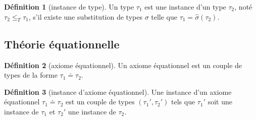 \documentclass [a4paper,12pt] {article}
\theoremstyle {definition}
\newtheorem {definition} {Définition} [subsection]
\begin{document}
\begin {definition} [instance de type]
	Un type $\tau_1$ est une instance d'un type $\tau_2$, noté $\tau_2 \leqslant_T \tau_1$, s'il existe une substitution de types $\sigma$  telle que $\tau_1 = \hat \sigma (\tau_2)$.
\end {definition}


\subsection {Théorie équationnelle}

\begin {definition} [axiome équationnel]
	Un axiome équationnel est un couple de types de la forme $\tau_1 \doteq \tau_2$.
\end {definition}

\begin {definition} [instance d'axiome équationnel]
	Une instance d'un axiome équationnel $\tau_1 \doteq \tau_2$ est un couple de types $(\tau_1', \tau_2')$ tels que $\tau_1'$ soit une instance de $\tau_1$ et $\tau_2'$ une instance de $\tau_2$.
\end {definition}
\end{document}
